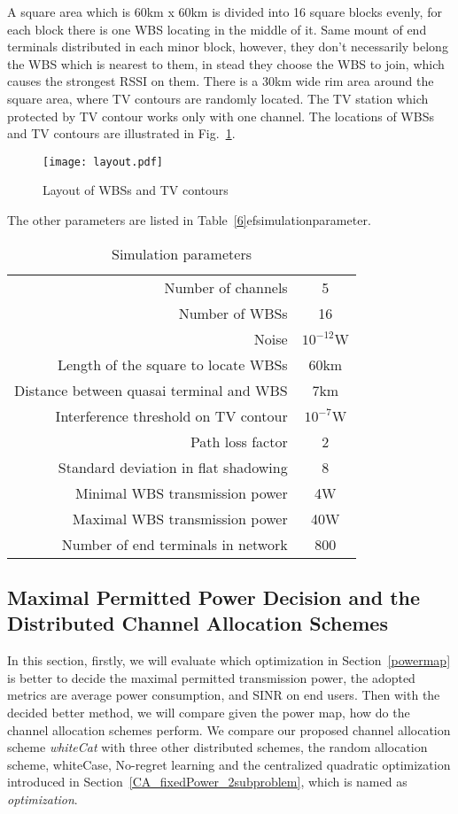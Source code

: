 A square area which is 60km x 60km is divided into 16 square blocks evenly, for each block there is one WBS locating in the middle of it. 
Same mount of end terminals distributed in each minor block, however, they don't necessarily belong the WBS which is nearest to them, in stead they choose the WBS to join, which causes the strongest \gls{RSSI} on them.
There is a 30km wide rim area around the square area, where TV contours are randomly located.
The TV station which protected by TV contour works only with one channel. 
The locations of WBSs and TV contours are illustrated in Fig.~\ref{sim:layout}.
\begin{figure}[h!]
  \centering
  \texttt{[image: layout.pdf]}
  \caption{Layout of WBSs and TV contours}
  \label{sim:layout}
\end{figure}
The other parameters are listed in Table~\ref{6}ef{simulationparameter}. 

\begin{table}[!h]
\centering
\begin{tabular}{|r|c|}
  \hline
  Number of channels 						& 5 \\
  Number of WBSs							& 16\\
  Noise 									& $10^{-12}$W \\ %
  Length of the square to locate WBSs		& 60km\\
  Distance between quasai terminal and WBS 	& 7km \\
  Interference threshold on TV contour 		& $10^{-7}$W \\ %
  Path loss factor 							& 2 \\
  Standard deviation in flat shadowing		& 8\\
  Minimal WBS transmission power 			& 4W \\
  Maximal WBS transmission power 			& 40W \\
  Number of end terminals in network 		& 800 \\
  \hline
\end{tabular}
\caption{Simulation parameters}
\label{simulationparameter}
\end{table}

\subsection{Maximal Permitted Power Decision and the Distributed Channel Allocation Schemes}
In this section, firstly, we will evaluate which optimization in Section~\ref{powermap} is better to decide the maximal permitted transmission power, the adopted metrics are average power consumption, and SINR on end users.
Then with the decided better method, we will compare given the power map, how do the channel allocation schemes perform.
We compare our proposed channel allocation scheme \textit{whiteCat} with three other distributed schemes, the random allocation scheme, whiteCase, No-regret learning and the centralized quadratic optimization introduced in Section~\ref{CA_fixedPower_2subproblem}, which is named as \textit{optimization}.



